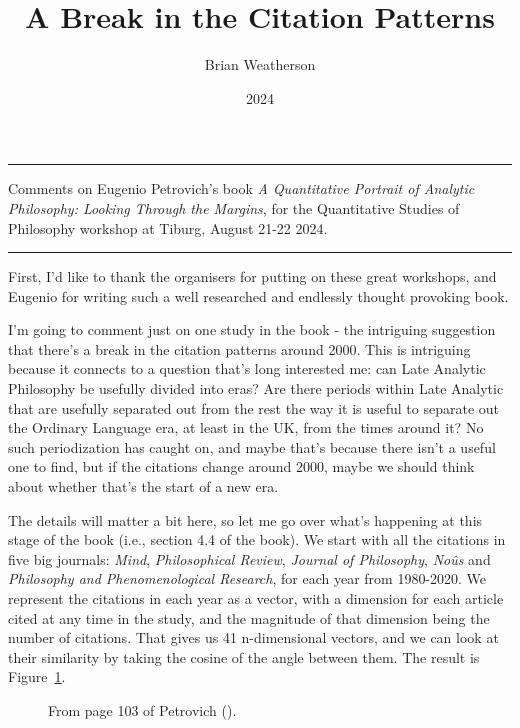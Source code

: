 \documentclass[
  10pt,
  letterpaper,
  DIV=11,
  numbers=noendperiod,
  twoside]{scrartcl}
\title{A Break in the Citation Patterns}
\author{Brian Weatherson}
\date{2024}
\makeatletter
\newcommand*\pandocbounded[1]{%
  \sbox\pandoc@box{#1}%
  \Gscale@div\@tempa{\textheight}{\dimexpr\ht\pandoc@box+\dp\pandoc@box\relax}%
  \Gscale@div\@tempb{\linewidth}{\wd\pandoc@box}%
  \ifdim\@tempb\p@<\@tempa\p@\let\@tempa\@tempb\fi%
  \ifdim\@tempa\p@<\p@\scalebox{\@tempa}{\usebox\pandoc@box}%
  \else\usebox{\pandoc@box}%
  \fi%
}
\renewenvironment{abstract}
 {\vspace{-1.25cm}
 \quotation\small\noindent\rule{\linewidth}{.5pt}\par\smallskip
 \noindent }
 {\par\noindent\rule{\linewidth}{.5pt}\endquotation}
\makeatother
\begin{document}
\maketitle
\begin{abstract}
Comments on Eugenio Petrovich's book \emph{A Quantitative Portrait of
Analytic Philosophy: Looking Through the Margins}, for the Quantitative
Studies of Philosophy workshop at Tiburg, August 21-22 2024.
\end{abstract}


First, I'd like to thank the organisers for putting on these great
workshops, and Eugenio for writing such a well researched and endlessly
thought provoking book.

I'm going to comment just on one study in the book - the intriguing
suggestion that there's a break in the citation patterns around 2000.
This is intriguing because it connects to a question that's long
interested me: can Late Analytic Philosophy be usefully divided into
eras? Are there periods within Late Analytic that are usefully separated
out from the rest the way it is useful to separate out the Ordinary
Language era, at least in the UK, from the times around it? No such
periodization has caught on, and maybe that's because there isn't a
useful one to find, but if the citations change around 2000, maybe we
should think about whether that's the start of a new era.

The details will matter a bit here, so let me go over what's happening
at this stage of the book (i.e., section 4.4 of the book). We start with
all the citations in five big journals: \emph{Mind}, \emph{Philosophical
Review}, \emph{Journal of Philosophy}, \emph{Noûs} and \emph{Philosophy
and Phenomenological Research}, for each year from 1980-2020. We
represent the citations in each year as a vector, with a dimension for
each article cited at any time in the study, and the magnitude of that
dimension being the number of citations. That gives us 41 n-dimensional
vectors, and we can look at their similarity by taking the cosine of the
angle between them. The result is Figure~\ref{fig-eugenio-matrix}.

\begin{figure}

\centering{

\pandocbounded{\texttt{[image: cosine-screenshot.png]}}

}

\caption{\label{fig-eugenio-matrix}From page 103 of Petrovich
().}

\end{figure}%
\end{document}
